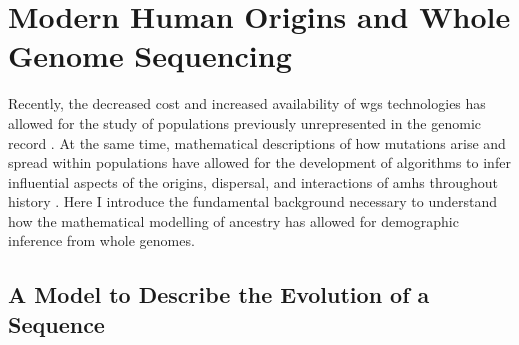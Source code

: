 %





\section{Modern Human Origins and Whole Genome Sequencing}

Recently, the decreased cost and increased availability of \gls{wgs} technologies has allowed for the study of populations previously unrepresented in the genomic record \cite{D2019,Wong2013,Wu2021,GS2019,Fan2019a}. At the same time, mathematical descriptions of how mutations arise and spread within populations have allowed for the development of algorithms to infer influential aspects of the origins, dispersal, and interactions of \glspl{amh} throughout history \cite{Hodgson2010}. Here I introduce the fundamental background necessary to understand how the mathematical modelling of ancestry has allowed for demographic inference from whole genomes. 


\subsection{A Model to Describe the Evolution of a Sequence}

